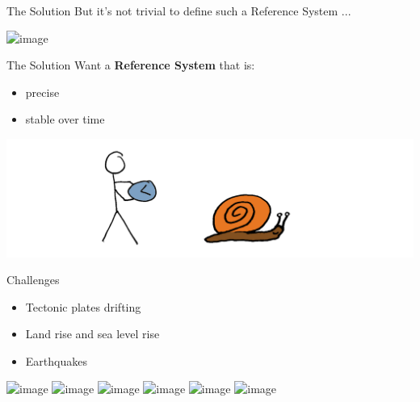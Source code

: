 \documentclass[12pt,table,t]{beamer}
\begin{document}
\begin{frame}[c]{The Solution}
  But it's not trivial to define such a Reference System ...

  \vspace*{4ex}
  \begin{center}
    \includegraphics<1>[width=\textwidth]{figure/origin}
  \end{center}
\end{frame}


\begin{frame}[c]{The Solution}
  Want a \textbf{Reference System} that is:

  \begin{itemize}
  \item<2-> precise
  \item<3-> stable over time
  \end{itemize}

  \begin{center}
    \includegraphics[width=\textwidth]{figure/time}
  \end{center}
\end{frame}


\begin{frame}[c]{Challenges}

  \begin{itemize}
  \item<2-> Tectonic plates drifting
  \item<3-> Land rise and sea level rise
  \item<4-> Earthquakes
  \end{itemize}
  
  \begin{center}
    \includegraphics<-1>[width=.3\textwidth]{figure/earth_sq}
    \includegraphics<2->[width=.3\textwidth]{figure/plate_drift_sq}
    \includegraphics<-2>[width=.3\textwidth]{figure/earth_sq}
    \includegraphics<3->[width=.3\textwidth]{figure/uplift}
    \includegraphics<-3>[width=.3\textwidth]{figure/earth_sq}
    \includegraphics<4->[width=.3\textwidth]{figure/earthquake_sq}
  \end{center}
\end{frame}
\end{document}
